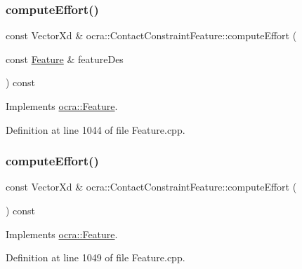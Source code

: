 \subsubsection{\texorpdfstring{compute\+Effort()}{computeEffort()}\hspace{0.1cm}{\footnotesize\ttfamily [1/2]}}
{\footnotesize\ttfamily const Vector\+Xd \& ocra\+::\+Contact\+Constraint\+Feature\+::compute\+Effort (\begin{DoxyParamCaption}\item[{const \hyperlink{classocra_1_1Feature}{Feature} \&}]{feature\+Des }\end{DoxyParamCaption}) const\hspace{0.3cm}{\ttfamily [virtual]}}



Implements \hyperlink{classocra_1_1Feature_a19626a241666fdae253af1f7b6f2acd7}{ocra\+::\+Feature}.



Definition at line 1044 of file Feature.\+cpp.

\hypertarget{classocra_1_1ContactConstraintFeature_a84b467c5da2810bef8a76525e617ad2d}{}\label{classocra_1_1ContactConstraintFeature_a84b467c5da2810bef8a76525e617ad2d} 
\subsubsection{\texorpdfstring{compute\+Effort()}{computeEffort()}\hspace{0.1cm}{\footnotesize\ttfamily [2/2]}}
{\footnotesize\ttfamily const Vector\+Xd \& ocra\+::\+Contact\+Constraint\+Feature\+::compute\+Effort (\begin{DoxyParamCaption}{ }\end{DoxyParamCaption}) const\hspace{0.3cm}{\ttfamily [virtual]}}



Implements \hyperlink{classocra_1_1Feature_ae43f2ffc54862d6ddc0b02fd39431eb6}{ocra\+::\+Feature}.



Definition at line 1049 of file Feature.\+cpp.

\hypertarget{classocra_1_1ContactConstraintFeature_a2d5b3c766e22c541e416ca52d14e78df}{}\label{classocra_1_1ContactConstraintFeature_a2d5b3c766e22c541e416ca52d14e78df} 
